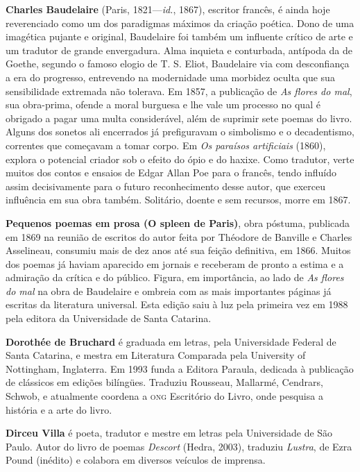 \textbf{Charles Baudelaire} (Paris, 1821---\textit{id.}, 1867), escritor francês, é
 ainda hoje reverenciado como um dos paradigmas máximos da criação poética.
 Dono de uma imagética pujante e original, Baudelaire foi também um
 influente crítico de arte e um tradutor de grande envergadura. Alma
 inquieta e conturbada, antípoda da de Goethe, segundo o famoso elogio de
 T. S. Eliot, Baudelaire via com desconfiança a era do progresso,
 entrevendo na modernidade uma morbidez oculta que sua sensibilidade
 extremada não tolerava. Em 1857, a publicação de \textit{As flores do mal}, sua
 obra-prima, ofende a moral burguesa e lhe vale um processo no qual é
 obrigado a pagar uma multa considerável, além de suprimir sete poemas do livro.
 Alguns dos sonetos ali encerrados
 já prefiguravam o simbolismo e o decadentismo, correntes que começavam a
 tomar corpo. Em \textit{Os paraísos artificiais} (1860), explora o potencial
 criador sob o efeito do ópio e do haxixe. Como tradutor, verte
 muitos dos contos e ensaios de  Edgar Allan Poe para o francês, tendo influído assim decisivamente
 para o futuro reconhecimento desse autor, que 
 exerceu influência em sua obra também. Solitário, doente e sem recursos,
 morre em 1867.

\textbf{Pequenos poemas em prosa (O spleen de Paris)}, obra póstuma, publicada em 1869 na reunião
 de escritos do autor feita por Théodore de Banville e Charles Asselineau,
 consumiu mais de dez anos até sua feição definitiva, em 1866. Muitos dos poemas
 já haviam aparecido em jornais e receberam de pronto a estima e a
 admiração da crítica e do público. Figura, em importância, ao lado de
 \textit{As flores do mal} na obra de Baudelaire e ombreia com
 as mais importantes páginas já escritas da literatura universal. Esta edição
saiu à luz pela primeira vez em 1988 pela editora da Universidade de Santa Catarina.

\textbf{Dorothée de Bruchard} é graduada em letras, pela Universidade Federal
 de Santa Catarina, e mestra em Literatura Comparada pela University of
 Nottingham, Inglaterra. Em 1993 funda a Editora Paraula, dedicada à
 publicação de clássicos em edições bilíngües. Traduziu Rousseau, Mallarmé,
 Cendrars, Schwob, e atualmente coordena a \textsc{ong} Escritório do Livro, onde
 pesquisa a história e a arte do livro.

\textbf{Dirceu Villa} é poeta, tradutor e mestre em letras pela Universidade
 de São Paulo. Autor do livro de poemas \textit{Descort} (Hedra, 2003), traduziu
 \textit{Lustra}, de Ezra Pound (inédito) e colabora em diversos veículos de imprensa.



